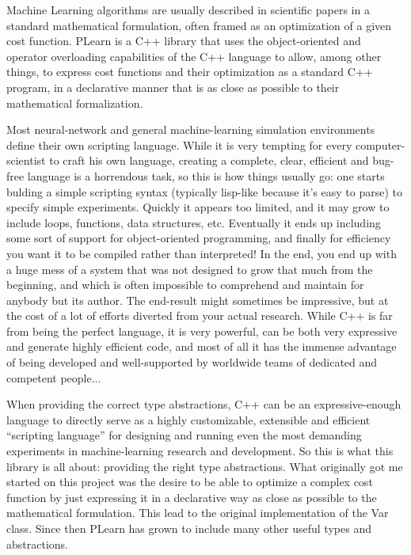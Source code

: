\documentclass[11pt]{book}
\begin{document}
Machine Learning algorithms are usually described in scientific
papers in a standard mathematical formulation, often framed as an
optimization of a given cost function. PLearn is a C++ library that uses
the object-oriented and operator overloading capabilities of the C++
language to allow, among other things, to express cost functions and
their optimization as a standard C++ program, in a declarative manner
that is as close as possible to their mathematical formalization.

 Most neural-network and general machine-learning simulation
environments define their own scripting language. While it is very
tempting for every computer-scientist to craft his own language,
creating a complete, clear, efficient and bug-free language is
a horrendous task, so this is how things usually go: one starts
bulding a simple scripting syntax (typically lisp-like because
it's easy to parse) to specify simple experiments. Quickly it
appears too limited, and it may grow to include loops, functions,
data structures, etc. Eventually it ends up including some sort of
support for object-oriented programming, and finally for efficiency
you want it to be compiled rather than interpreted! In the end,
you end up with a huge mess of a system that was not designed to
grow that much from the beginning, and which is often impossible to
comprehend and maintain for anybody but its author. The end-result
might sometimes be impressive, but at the cost of a lot of efforts
diverted from your actual research. While C++ is far from being the
perfect language, it is very powerful, can be both very expressive and
generate highly efficient code, and most of all it has the immense
advantage of being developed and well-supported by worldwide teams
of dedicated and competent people...


When providing the correct type abstractions, C++ can be an
expressive-enough language to directly serve as a highly customizable,
extensible and efficient ``scripting language'' for designing and
running even the most demanding experiments in machine-learning research
and development. So this is what this library is all about: providing
the right type abstractions. What originally got me started on this
project was the desire to be able to optimize a complex cost function
by just expressing it in a declarative way as close as possible to the
mathematical formulation. This lead to the original implementation of
the Var class. Since then PLearn has grown to include many other useful
types and abstractions.
\end{document}

